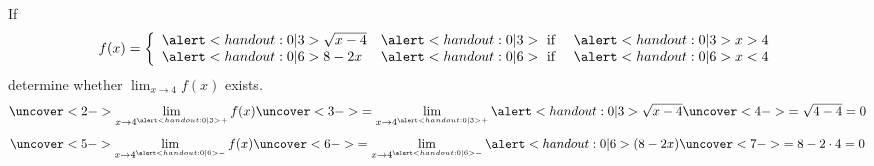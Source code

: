 \begin{frame}
\begin{example}%
If
\[
f(x) = \left\{ \begin{array}{lcr}
\alert<handout:0| 3>{\sqrt{x-4}} & \alert<handout:0| 3>{\text{ if }} & \alert<handout:0| 3>{x > 4} \\
\alert<handout:0| 6>{8 - 2x} & \alert<handout:0| 6>{\text{ if }} & \alert<handout:0| 6>{x < 4} 
\end{array}\right.
\]
determine whether $\lim_{x\rightarrow 4} f(x)$ exists.
\[
\uncover<2->{\lim_{x\rightarrow 4^{\alert<handout:0| 3>{+}}}f(x)} \uncover<3->{ = \lim_{x\rightarrow 4^{\alert<handout:0| 3>{+}}}\alert<handout:0| 3>{\sqrt{x-4}}} \uncover<4->{ = \sqrt{4 - 4} = 0}
\]
\[
\uncover<5->{\lim_{x\rightarrow 4^{\alert<handout:0| 6>{-}}}f(x)} \uncover<6->{ = \lim_{x\rightarrow 4^{\alert<handout:0| 6>{-}}}\alert<handout:0| 6>{(8 - 2x)}} \uncover<7->{ = 8 - 2\cdot 4 = 0}
\]
\end{example}
\end{frame}
